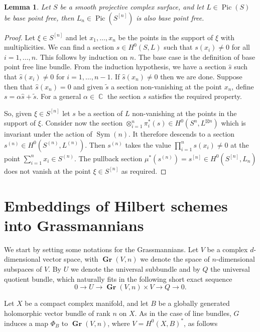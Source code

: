 \documentclass{article}
\DeclareMathOperator{\bC}{\mathbb{C}}
\DeclareMathOperator{\Sym}{Sym}
\DeclareMathOperator{\Pic}{Pic}
\DeclareMathOperator{\gr}{\mathbf{Gr}}
\newcommand{\hilb}[2][n]{#2^{[#1]}}
\newcommand{\sym}[2][n]{#2^{(#1)}}
\newtheorem{lemma}[proposition]{Lemma}
\begin{document}
\begin{lemma}\label{lemma_bpf_of_L_n_on_Hilb_n}
Let $S$ be a smooth projective complex surface, and let $L\in\Pic(S)$ be base point free, then $L_n\in \Pic(\hilb{S})$ is also base point free.    
\end{lemma}
\begin{proof}
Let $\xi\in\hilb{S}$ and let $x_1,\dots,x_n$ be the points in the support of $\xi$ with multiplicities. We can find a section $s\in H^0(S,L)$ such that $s(x_i)\neq 0$ for all $i=1,\dots,n.$ This follows by induction on $n$. The base case is the definition of base point free line bundle. From the induction hypothesis, we have a section $\hat{s}$ such that $\hat{s}(x_i)\neq 0$ for $i=1,\dots,n-1$. If $\hat{s}(x_n)\neq 0$ then we are done. Suppose then that $\hat{s}(x_n)= 0$ and given $\tilde{s}$ a section non-vanishing at the point $x_n$, define $s=\alpha \hat{s}+\tilde{s}$. For a general $\alpha\in\bC$ the section $s$ satisfies the required property.

So, given $\xi\in\hilb{S}$ let $s$ be a section of $L$ non-vanishing at the points in the support of $\xi$. Consider now the section $\otimes_{i=1}^n\pi_i^*(s)\in H^0(S^n,L^{\boxtimes n})$ which is invariant under the action of $\Sym(n)$. It therefore descends to a section $\sym{s}\in H^0(\sym{S},\sym{L})$. Then $\sym{s}$ takes the value $\prod_{i=1}^ns(x_i)\neq0$ at the point $\sum_{i=1}^nx_i\in\sym{S}$. The pullback section $\mu^*(\sym{s})=\hilb{s}\in H^0(\hilb{S},L_n)$ does not vanish at the point $\xi\in\hilb{S}$ as required.

\end{proof}

 \section{Embeddings of Hilbert schemes into Grassmannians}\label{sect_grass}

We start by setting some notations for the Grassmannians. Let $V$ be a complex $d$-dimensional vector space, with $\gr(V,n)$ we denote the space of $n$-dimensional subspaces of $V$. By $U$ we denote the universal subbundle and by $Q$ the universal quotient bundle, which naturally fits in the following short exact sequence $$0\to U\to \gr(V,n)\times V\to Q\to 0.$$ 

Let $X$ be a compact complex manifold, and let $B$ be a globally generated holomorphic vector bundle of rank $n$ on $X$. As in the case of line bundles, $G$ induces a map $\Phi_B$ to $\gr(V,n)$, where $V=H^0(X,B)^*$, as follows
\end{document}
